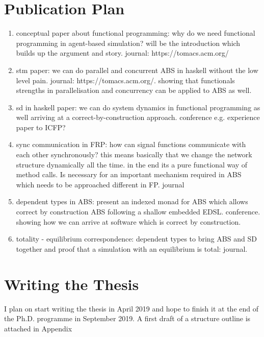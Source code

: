 \section{Publication Plan}
\begin{enumerate}
	\item conceptual paper about functional programming: why do we need functional programming in agent-based simulation? will be the introduction which builds up the argument and story. journal: https://tomacs.acm.org/
	\item stm paper: we can do parallel and concurrent ABS in haskell without the low level pain. journal: https://tomacs.acm.org/. showing that functionals strengths in parallelisation and concurrency can be applied to ABS as well.
	\item sd in haskell paper: we can do system dynamics in functional programming as well arriving at a correct-by-construction approach. conference e.g. experience paper to ICFP? 
	\item sync communication in FRP: how can signal functions communicate with each other synchronously? this means basically that we change the network structure dynamically all the time. in the end its a pure functional way of method calls. Is necessary for an important mechanism required in ABS which needs to be approached different in FP. journal
	\item dependent types in ABS: present an indexed monad for ABS which allows correct by construction ABS following a shallow embedded EDSL. conference. showing how we can arrive at software which is correct by construction.
	\item totality - equilibrium correspondence: dependent types to bring ABS and SD together and proof that a simulation with an equilibrium is total: journal. 

\end{enumerate}

\section{Writing the Thesis}
I plan on start writing the thesis in April 2019 and hope to finish it at the end of the Ph.D. programme in September 2019. A first draft of a structure outline is attached in Appendix 

\clearpage

